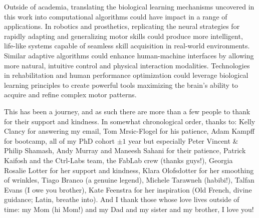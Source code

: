 \begin{impactstatement}
Outside of academia, translating the biological learning mechanisms uncovered in this work into computational algorithms could have impact in a range of applications. In robotics and prosthetics, replicating the neural strategies for rapidly adapting and generalizing motor skills could produce more intelligent, life-like systems capable of seamless skill acquisition in real-world environments. Similar adaptive algorithms could enhance human-machine interfaces by allowing more natural, intuitive control and physical interaction modalities. Technologies in rehabilitation and human performance optimization could leverage biological learning principles to create powerful tools maximizing the brain's ability to acquire and refine complex motor patterns.
\end{impactstatement}

\begin{acknowledgements}
    
    This has been a journey, and as such there are more than a few people to thank for their support and kindness. In somewhat chronological order, thanks to: Kelly Clancy for answering my email, Tom Mrsic-Flogel for his patience, Adam Kampff for bootcamp, all of my PhD cohort $\pm1$ year but especially Peter Vincent \& Philip Shamash, Andy Murray and Maneesh Sahani for their patience, Patrick Kaifosh and the Ctrl-Labs team, the FabLab crew (thanks guys!), Georgia Rosalie Lotter for her support and kindness, Klara Olofsdotter for her smoothing of wrinkles, Tiago Branco (a genuine legend), Michele Tarawneh (habibi!), Talfan Evans (I owe you brother), Kate Feenstra for her inspiration (Old French, divine guidance; Latin, breathe into). And I thank those whose love lives outside of time: my Mom (hi Mom!) and my Dad and my sister and my brother, I love you!

\end{acknowledgements}

\setcounter{tocdepth}{2}
\cleardoublepage\tableofcontents

\cleardoublepage\listoffigures

